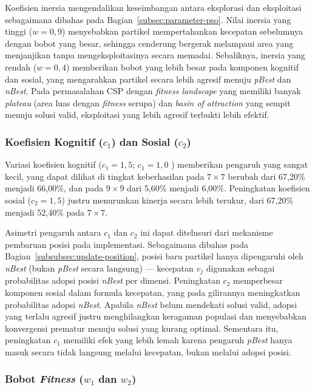 Koefisien inersia mengendalikan keseimbangan antara eksplorasi dan eksploitasi sebagaimana dibahas pada Bagian~\ref{subsec:parameter-pso}. Nilai inersia yang tinggi ($w = 0{,}9$) menyebabkan partikel mempertahankan kecepatan sebelumnya dengan bobot yang besar, sehingga cenderung bergerak melampaui area yang menjanjikan tanpa mengeksploitasinya secara memadai. Sebaliknya, inersia yang rendah ($w = 0{,}4$) memberikan bobot yang lebih besar pada komponen kognitif dan sosial, yang mengarahkan partikel secara lebih agresif menuju \textit{pBest} dan \textit{nBest}. Pada permasalahan CSP dengan \textit{fitness landscape} yang memiliki banyak \textit{plateau} (area luas dengan \textit{fitness} serupa) dan \textit{basin of attraction} yang sempit menuju solusi valid, eksploitasi yang lebih agresif terbukti lebih efektif.

\subsubsection{Koefisien Kognitif ($c_1$) dan Sosial ($c_2$)}

Variasi koefisien kognitif ($c_1 = 1{,}5$; $c_1 = 1{,}0$ ) memberikan pengaruh yang sangat kecil, yang dapat dilihat di tingkat keberhasilan pada $7 \times 7$ berubah dari 67,20\% menjadi 66,00\%, dan pada $9 \times 9$ dari 5,60\% menjadi 6,00\%. Peningkatan koefisien sosial ($c_2 = 1{,}5$) justru menurunkan kinerja secara lebih terukur, dari 67,20\% menjadi 52,40\% pada $7 \times 7$.

Asimetri pengaruh antara $c_1$ dan $c_2$ ini dapat ditelusuri dari mekanisme pembaruan posisi pada implementasi. Sebagaimana dibahas pada Bagian~\ref{subsubsec:update-position}, posisi baru partikel hanya dipengaruhi oleh \textit{nBest} (bukan \textit{pBest} secara langsung) — kecepatan $v_j$ digunakan sebagai probabilitas adopsi posisi \textit{nBest} per dimensi. Peningkatan $c_2$ memperbesar komponen sosial dalam formula kecepatan, yang pada gilirannya meningkatkan probabilitas adopsi \textit{nBest}. Apabila \textit{nBest} belum mendekati solusi valid, adopsi yang terlalu agresif justru menghilangkan keragaman populasi dan menyebabkan konvergensi prematur menuju solusi yang kurang optimal. Sementara itu, peningkatan $c_1$ memiliki efek yang lebih lemah karena pengaruh \textit{pBest} hanya masuk secara tidak langsung melalui kecepatan, bukan melalui adopsi posisi.

\subsubsection{Bobot \textit{Fitness} ($w_1$ dan $w_2$)}

